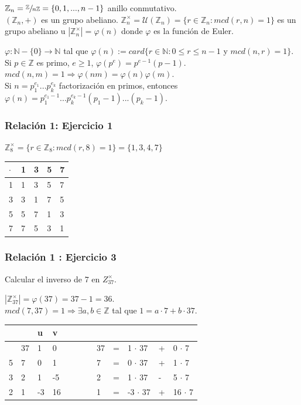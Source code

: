 \documentclass[11pt,a4paper]{article}
\begin{document}
$\mathbb{Z}_{n} = \sfrac{\mathbb{Z}}{n\mathbb{Z}} = \{0, 1, ..., n-1\}$ anillo conmutativo. \\$(\mathbb{Z}_{n}, +)$ es un grupo abeliano.
$\mathbb{Z}^{\times}_{n} = \mathcal{U}(\mathbb{Z}_{n}) = \{r \in \mathbb{Z}_{n}: mcd(r,n) = 1\}$ es un grupo abeliano u $|\mathbb{Z}_{n}^{\times}| = \varphi(n)$ donde $\varphi$ es la función de Euler.

$\varphi: \mathbb{N} - \{0\} \to \mathbb{N}$ tal que $\varphi(n) := card\{r \in \mathbb{N}: 0 \leq r \leq n-1$ y $mcd(n,r)=1\}$. \\
Si $p \in \mathbb{Z}$ es primo, $e \geq 1$, $\varphi(p^{e}) = p^{e-1}(p-1)$. \\
$mcd(n,m) = 1 \Rightarrow \varphi(nm) = \varphi(n) \varphi(m)$. \\
Si $n = p_{1}^{e_{1}}...p_{k}^{e_{k}}$ factorización en primos, entonces \\ $\varphi(n) = p_{1}^{e_{1}-1}...p_{k}^{e_{k}-1}(p_{1}-1)...(p_{k}-1)$.

\subsubsection*{Relación 1: Ejercicio 1}

$\mathbb{Z}_{8}^{\times} = \{r \in \mathbb{Z}_{8}: mcd(r,8) = 1\} = \{1,3,4,7\}$

\begin{table}[h!]
\begin{tabular}{l|llll}
$\cdot$  & 1 & 3 & 5 & 7 \\ \hline
1 & 1 & 3 & 5 & 7 \\
3 & 3 & 1 & 7 & 5 \\
5 & 5 & 7 & 1 & 3 \\
7 & 7 & 5 & 3 & 1
\end{tabular}
\end{table}

\subsubsection*{Relación 1 : Ejercicio 3}

Calcular el inverso de $7$ en $Z_{37}^{\times}$.

$|\mathbb{Z}_{37}^{\times}| = \varphi(37) = 37-1 = 36$. \\
$mcd(7,37) = 1 \Rightarrow \exists a,b \in \mathbb{Z}$ tal que $1 = a \cdot 7 + b \cdot 37$.

\begin{table}[h!]
\begin{tabular}{ll|llllllll}
 & & u & v & $\hspace{1cm}$ & & & & & \\ \hline
 & 37 & 1 & 0 & & 37 & = & 1 $\cdot$ 37 & + & 0 $\cdot$ 7 \\
5 & 7 & 0 & 1 & & 7 & = & 0 $\cdot$ 37 & + & 1 $\cdot$ 7 \\
3 & 2 & 1 & -5 & & 2 & = & 1 $\cdot$ 37 & - & 5 $\cdot$ 7\\
2 & 1 & -3 & 16 & & 1 & = & -3 $\cdot$ 37 & + & 16 $\cdot$ 7
\end{tabular}
\end{table}
\end{document}
